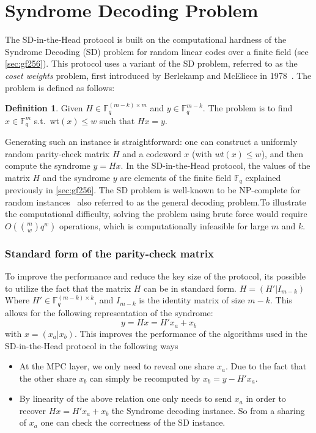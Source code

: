\documentclass[twoside,11pt]{report}
\theoremstyle{definition}
\newtheorem{definition}{Definition}[section]
\theoremstyle{plain}
\begin{document}
\section{Syndrome Decoding Problem}\label{sec:syndrome}

The SD-in-the-Head protocol is built on the computational hardness of the Syndrome Decoding (SD) problem for random linear codes over a finite field (see \autoref{sec:gf256}). This protocol uses a variant of the SD problem, referred to as the \textit{coset weights} problem, first introduced by Berlekamp and McEliece in 1978~\cite{berlekamp1978inherent}. The problem is defined as follows:
\begin{definition}\label{def:syndrome}
  Given $H \in \mathbb{F}^{(m-k)\times m}_q$ and $y \in \mathbb{F}^{m-k}_q$. The problem is to find $x \in \mathbb{F}^m_q$ s.t.\ wt$(x) \leq w$ such that $Hx = y$.
\end{definition}
Generating such an instance is straightforward: one can construct a uniformly random parity-check matrix $H$ and a codeword $x$ (with $wt(x) \leq w$), and then compute the syndrome $y = Hx$. In the SD-in-the-Head protocol, the values of the matrix $H$ and the syndrome $y$ are elements of the finite field $\mathbb{F}_q$ explained previously in \autoref{sec:gf256}. The SD problem is well-known to be NP-complete for random instances~\cite{berlekamp1978inherent} also referred to as the general decoding problem.To illustrate the computational difficulty, solving the problem using brute force would require $O(\binom{m}{w} q^w)$ operations, which is computationally infeasible for large $m$ and $k$.

\subsubsection{Standard form of the parity-check matrix}\label{sec:standard_form_of_the_parity_check_matrix}
To improve the performance and reduce the key size of the protocol, its possible to utilize the fact that the matrix $H$ can be in standard form. $H = (H'|I_{m-k}) $ Where $H' \in \mathbb{F}^{(m-k)\times k}_q$, and $I_{m-k}$ is the identity matrix of size $m-k$. This allows for the following representation of the syndrome:
\begin{equation}
  y = Hx = H'x_a + x_b\label{eq:standard_form_of_the_parity_check_matrix}
\end{equation}
with $x = (x_a | x_b)$. This improves the performance of the algorithms used in the SD-in-the-Head protocol in the following ways
\begin{itemize}
  \item At the MPC layer, we only need to reveal one share $x_a$. Due to the fact that the other share $x_b$ can simply be recomputed by $x_b = y - H'x_a$.
  \item By linearity of the above relation one only needs to send $x_a$ in order to recover $Hx = H'x_a + x_b$ the Syndrome decoding instance. So from a sharing of $x_a$ one can check the correctness of the SD instance.
\end{itemize}
\end{document}
